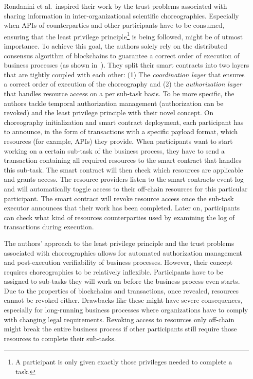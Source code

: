 Rondanini et al.\ inspired their work by the trust problems associated with sharing information in inter-organizational scientific choreographies. Especially when APIs of counterparties and other participants have to be consumed, ensuring that the least privilege principle\footnote{A participant is only given exactly those privileges needed to complete a task.} is being followed, might be of utmost importance. To achieve this goal, the authors solely rely on the distributed consensus algorithm of blockchains to guarantee a correct order of execution of business processes (as shown in~\cite{blockchain_for_secure_io_bp}). They split their smart contracts into two layers that are tightly coupled with each other: (1) The \textit{coordination layer} that ensures a correct order of execution of the choreography and (2) the \textit{authorization layer} that handles resource access on a per sub-task basis. To be more specific, the authors tackle temporal authorization management (authorization can be revoked) and the least privilege principle with their novel concept. On choreography initialization and smart contract deployment, each participant has to announce, in the form of transactions with a specific payload format, which resources (for example, APIs) they provide. When participants want to start working on a certain sub-task of the business process, they have to send a transaction containing all required resources to the smart contract that handles this sub-task. The smart contract will then check which resources are applicable and grants access. The resource providers listen to the smart contracts event log and will automatically toggle access to their off-chain resources for this particular participant. The smart contract will revoke resource access once the sub-task executor announces that their work has been completed. Later on, participants can check what kind of resources counterparties used by examining the log of transactions during execution.

The authors' approach to the least privilege principle and the trust problems associated with choreographies allows for automated authorization management and post-execution verifiability of business processes. However, their concept requires choreographies to be relatively inflexible. Participants have to be assigned to sub-tasks they will work on before the business process even starts. Due to the properties of blockchains and transactions, once revealed, resources cannot be revoked either. Drawbacks like these might have severe consequences, especially for long-running business processes where organizations have to comply with changing legal requirements. Revoking access to resources only off-chain might break the entire business process if other participants still require those resources to complete their sub-tasks.


